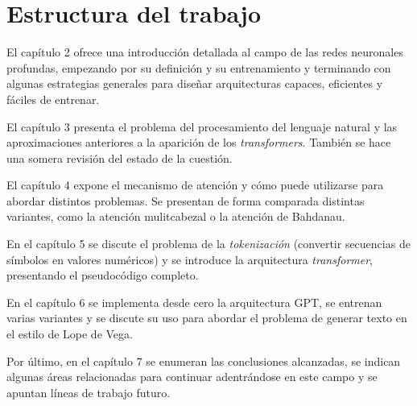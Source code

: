 \section{Estructura del trabajo}
El capítulo 2 ofrece una introducción detallada al campo de las redes neuronales profundas, empezando por su definición y su entrenamiento y terminando con algunas estrategias generales para diseñar arquitecturas capaces, eficientes y fáciles de entrenar.

El capítulo 3 presenta el problema del procesamiento del lenguaje natural y las aproximaciones anteriores a la aparición de los \textit{transformers}. También se hace una somera revisión del estado de la cuestión.

El capítulo 4 expone el mecanismo de atención y cómo puede utilizarse para abordar distintos problemas. Se presentan de forma comparada distintas variantes, como la atención mulitcabezal o la atención de Bahdanau.

En el capítulo 5 se discute el problema de la \textit{tokenización} (convertir secuencias de símbolos en valores numéricos) y se introduce la arquitectura \textit{transformer}, presentando el pseudocódigo completo. 

En el capítulo 6 se implementa desde cero la arquitectura GPT, se entrenan varias variantes y se discute su uso para abordar el problema de generar texto en el estilo de Lope de Vega.

Por último, en el capítulo 7 se enumeran las conclusiones alcanzadas, se indican algunas áreas relacionadas para continuar adentrándose en este campo y se apuntan líneas de trabajo futuro.
